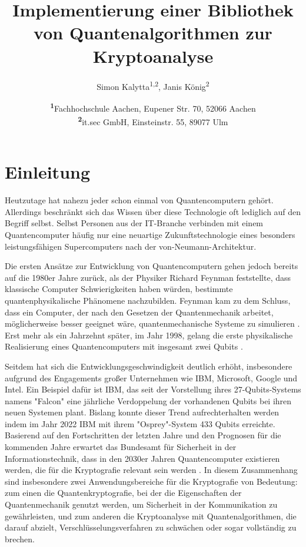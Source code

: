 \documentclass[
	a4paper, %
	10pt, %
	unnumberedsections, %
	twoside, %
]{LTJournalArticle}
\title{Implementierung einer Bibliothek von Quantenalgorithmen zur Kryptoanalyse} %
\author{%
	Simon Kalytta\textsuperscript{1,2}, Janis König\textsuperscript{2}
}
\date{\footnotesize\textsuperscript{\textbf{1}}Fachhochschule Aachen, Eupener Str. 70, 52066 Aachen\\ \textsuperscript{\textbf{2}}it.sec GmbH, Einsteinstr. 55, 89077 Ulm}
\begin{document}
\maketitle %


\section{Einleitung}

Heutzutage hat nahezu jeder schon einmal von Quantencomputern gehört. Allerdings beschränkt sich das Wissen über diese Technologie oft lediglich auf den Begriff selbst. Selbst Personen aus der IT-Branche verbinden mit einem Quantencomputer häufig nur eine neuartige Zukunftstechnologie eines besonders leistungsfähigen Supercomputers nach der von-Neumann-Architektur.

Die ersten Ansätze zur Entwicklung von Quantencomputern gehen jedoch bereits auf die 1980er Jahre zurück, als der Physiker Richard Feynman feststellte, dass klassische Computer Schwierigkeiten haben würden, bestimmte quantenphysikalische Phänomene nachzubilden. Feynman kam zu dem Schluss, dass ein Computer, der nach den Gesetzen der Quantenmechanik arbeitet, möglicherweise besser geeignet wäre, quantenmechanische Systeme zu simulieren \autocite{Feynman:1982}. Erst mehr als ein Jahrzehnt später, im Jahr 1998, gelang die erste physikalische Realisierung eines Quantencomputers mit insgesamt zwei Qubits \autocite{Chuang:1998ExperimentalIO}.

Seitdem hat sich die Entwicklungsgeschwindigkeit deutlich erhöht, insbesondere aufgrund des Engagements großer Unternehmen wie IBM, Microsoft, Google und Intel. Ein Beispiel dafür ist IBM, das seit der Vorstellung ihres 27-Qubits-Systems namens "Falcon" eine jährliche Verdoppelung der vorhandenen Qubits bei ihren neuen Systemen plant. Bislang konnte dieser Trend aufrechterhalten werden indem im Jahr 2022 IBM mit ihrem "Osprey"-System 433 Qubits erreichte\autocite{IBM:2022}.
Basierend auf den Fortschritten der letzten Jahre und den Prognosen für die kommenden Jahre erwartet das Bundesamt für Sicherheit in der Informationstechnik, dass in den 2030er Jahren Quantencomputer existieren werden, die für die Kryptografie relevant sein werden \autocite{BSI:2023}. In diesem Zusammenhang sind insbesondere zwei Anwendungsbereiche für die Kryptografie von Bedeutung: zum einen die Quantenkryptografie, bei der die Eigenschaften der Quantenmechanik genutzt werden, um Sicherheit in der Kommunikation zu gewährleisten, und zum anderen die Kryptoanalyse mit Quantenalgorithmen, die darauf abzielt, Verschlüsselungsverfahren zu schwächen oder sogar vollständig zu brechen.
\end{document}

